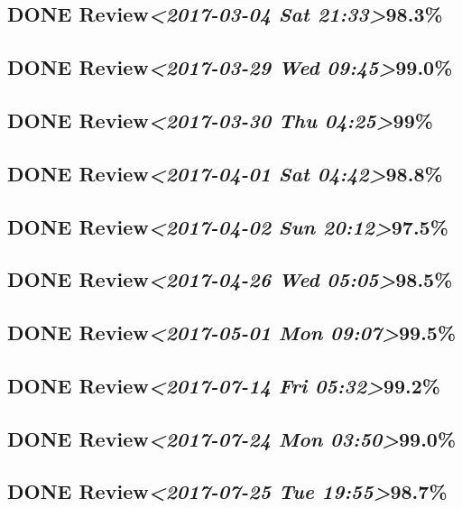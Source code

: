 \documentclass[11pt]{ctexart}
\begin{document}
\subsection{{\bfseries\sffamily DONE} Review\textit{<2017-03-04 Sat 21:33>}98.3\%}
\label{sec:orge99bd8b}
\subsection{{\bfseries\sffamily DONE} Review\textit{<2017-03-29 Wed 09:45>}99.0\%}
\label{sec:org2fac670}
\subsection{{\bfseries\sffamily DONE} Review\textit{<2017-03-30 Thu 04:25>}99\%}
\label{sec:org41e63ad}
\subsection{{\bfseries\sffamily DONE} Review\textit{<2017-04-01 Sat 04:42>}98.8\%}
\label{sec:org689f05b}
\subsection{{\bfseries\sffamily DONE} Review\textit{<2017-04-02 Sun 20:12>}97.5\%}
\label{sec:orgb17dec3}
\subsection{{\bfseries\sffamily DONE} Review\textit{<2017-04-26 Wed 05:05>}98.5\%}
\label{sec:org30b0302}
\subsection{{\bfseries\sffamily DONE} Review\textit{<2017-05-01 Mon 09:07>}99.5\%}
\label{sec:org2ad5493}
\subsection{{\bfseries\sffamily DONE} Review\textit{<2017-07-14 Fri 05:32>}99.2\%}
\label{sec:orgb58ffa4}
\subsection{{\bfseries\sffamily DONE} Review\textit{<2017-07-24 Mon 03:50>}99.0\%}
\label{sec:org420095f}
\subsection{{\bfseries\sffamily DONE} Review\textit{<2017-07-25 Tue 19:55>}98.7\%}
\label{sec:org77bbf3f}
\end{document}
